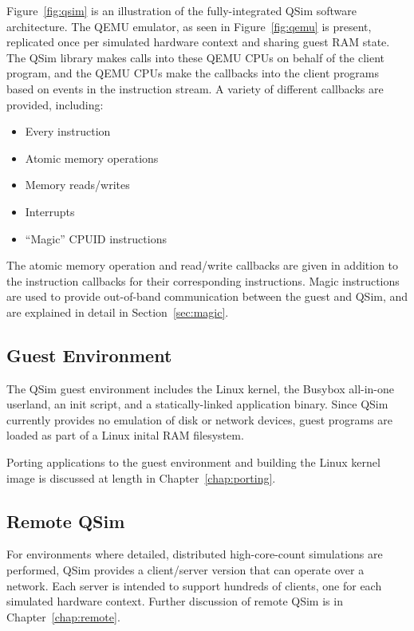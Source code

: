 \documentclass[letterpaper, 10pt]{book}
\begin{document}
Figure~\ref{fig:qsim} is an illustration of the fully-integrated QSim software
architecture. The QEMU emulator, as seen in Figure~\ref{fig:qemu} is present,
replicated once per simulated hardware context and sharing guest RAM state. The
QSim library makes calls into these QEMU CPUs on behalf of the client program,
and the QEMU CPUs make the callbacks into the client programs based on events in
the instruction stream. A variety of different callbacks are provided,
including:

\begin{itemize}
  \item{Every instruction}
  \item{Atomic memory operations}
  \item{Memory reads/writes}
  \item{Interrupts}
  \item{``Magic'' CPUID instructions}
\end{itemize}

The atomic memory operation and read/write callbacks are given in addition to
the instruction callbacks for their corresponding instructions. Magic
instructions are used to provide out-of-band communication between the guest and
QSim, and are explained in detail in Section~\ref{sec:magic}.

\subsection{Guest Environment}

The QSim guest environment includes the Linux kernel, the Busybox all-in-one
userland, an init script, and a statically-linked application binary. Since QSim
currently provides no emulation of disk or network devices, guest programs are
loaded as part of a Linux inital RAM filesystem.

Porting applications to the guest environment and building the Linux kernel
image is discussed at length in Chapter~\ref{chap:porting}.

\subsection{Remote QSim}

For environments where detailed, distributed high-core-count simulations are
performed, QSim provides a client/server version that can operate over a
network. Each server is intended to support hundreds of clients, one for each
simulated hardware context. Further discussion of remote QSim is in
Chapter~\ref{chap:remote}.
\end{document}
